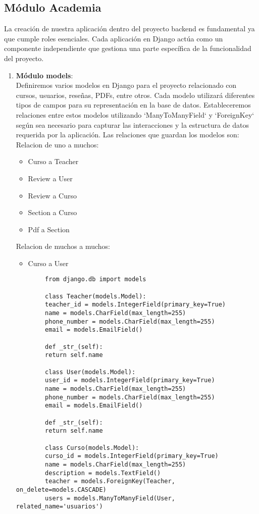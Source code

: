 \subsection*{Módulo Academia}
La creación de nuestra aplicación dentro del proyecto backend es fundamental ya que cumple roles esenciales. Cada aplicación en Django actúa como un componente independiente que gestiona una parte específica de la funcionalidad del proyecto. 
\begin{enumerate}
	\item \textbf{Módulo models}: \\
	Definiremos varios modelos en Django para el proyecto relacionado con cursos, usuarios, reseñas, PDFs, entre otros. Cada modelo utilizará diferentes tipos de campos para su representación en la base de datos. Estableceremos relaciones entre estos modelos utilizando `ManyToManyField` y `ForeignKey` según sea necesario para capturar las interacciones y la estructura de datos requerida por la aplicación.
	Las relaciones que guardan los modelos son:\\
	Relacion de uno a muchos:
	\begin{itemize}
		\item Curso a Teacher
		\item Review a User
		\item Review a Curso
		\item Section a Curso
		\item Pdf a Section
	\end{itemize}
	Relacion de muchos a muchos:
	\begin{itemize}
		\item Curso a User
	\end{itemize}
	\begin{verbatim}
		from django.db import models
		
		class Teacher(models.Model):
		teacher_id = models.IntegerField(primary_key=True)
		name = models.CharField(max_length=255)
		phone_number = models.CharField(max_length=255)
		email = models.EmailField()
		
		def _str_(self):
		return self.name
		
		class User(models.Model):
		user_id = models.IntegerField(primary_key=True)
		name = models.CharField(max_length=255)
		phone_number = models.CharField(max_length=255)
		email = models.EmailField()
		
		def _str_(self):
		return self.name
		
		class Curso(models.Model):
		curso_id = models.IntegerField(primary_key=True)
		name = models.CharField(max_length=255)
		description = models.TextField()
		teacher = models.ForeignKey(Teacher, on_delete=models.CASCADE)
		users = models.ManyToManyField(User, related_name='usuarios')
		

\end{verbatim}
\end{enumerate}
